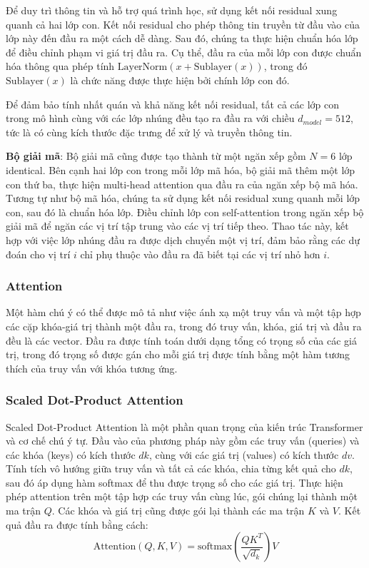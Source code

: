 Để duy trì thông tin và hỗ trợ quá trình học, sử dụng kết nối residual xung quanh cả hai lớp con. Kết nối residual cho phép thông tin truyền từ đầu vào của lớp này đến đầu ra một cách dễ dàng. Sau đó, chúng ta thực hiện chuẩn hóa lớp để điều chỉnh phạm vi giá trị đầu ra. Cụ thể, đầu ra của mỗi lớp con được chuẩn hóa thông qua phép tính $\text{LayerNorm}(x + \text{Sublayer}(x))$, trong đó $\text{Sublayer}(x)$ là chức năng được thực hiện bởi chính lớp con đó.

Để đảm bảo tính nhất quán và khả năng kết nối residual, tất cả các lớp con trong mô hình cùng với các lớp nhúng đều tạo ra đầu ra với chiều $d_{model} = 512$, tức là có cùng kích thước đặc trưng để xử lý và truyền thông tin.

\textbf{Bộ giải mã}: Bộ giải mã cũng được tạo thành từ một ngăn xếp gồm $N = 6$ lớp identical. Bên cạnh hai lớp con trong mỗi lớp mã hóa, bộ giải mã thêm một lớp con thứ ba, thực hiện multi-head attention qua đầu ra của ngăn xếp bộ mã hóa. Tương tự như bộ mã hóa, chúng ta sử dụng kết nối residual xung quanh mỗi lớp con, sau đó là chuẩn hóa lớp. Điều chỉnh lớp con self-attention trong ngăn xếp bộ giải mã để ngăn các vị trí tập trung vào các vị trí tiếp theo. Thao tác này, kết hợp với việc lớp nhúng đầu ra được dịch chuyển một vị trí, đảm bảo rằng các dự đoán cho vị trí $i$ chỉ phụ thuộc vào đầu ra đã biết tại các vị trí nhỏ hơn $i$.

\subsubsection*{Attention}
Một hàm chú ý có thể được mô tả như việc ánh xạ một truy vấn và một tập hợp các cặp khóa-giá trị thành một đầu ra, trong đó truy vấn, khóa, giá trị và đầu ra đều là các vector. Đầu ra được tính toán dưới dạng tổng có trọng số của các giá trị, trong đó trọng số được gán cho mỗi giá trị được tính bằng một hàm tương thích của truy vấn với khóa tương ứng.

\subsubsection*{Scaled Dot-Product Attention}
Scaled Dot-Product Attention là một phần quan trọng của kiến trúc Transformer và cơ chế chú ý tự. Đầu vào của phương pháp này gồm các truy vấn (queries) và các khóa (keys) có kích thước $dk$, cùng với các giá trị (values) có kích thước $dv$. Tính tích vô hướng giữa truy vấn và tất cả các khóa, chia từng kết quả cho $dk$, sau đó áp dụng hàm softmax để thu được trọng số cho các giá trị. Thực hiện phép attention trên một tập hợp các truy vấn cùng lúc, gói chúng lại thành một ma trận $Q$. Các khóa và giá trị cũng được gói lại thành các ma trận $K$ và $V$. Kết quả đầu ra được tính bằng cách:
\[
    \text{Attention}(Q, K, V) = \text{softmax} (\frac{ QK^T }{ \sqrt{d_k} }) V   
\]

